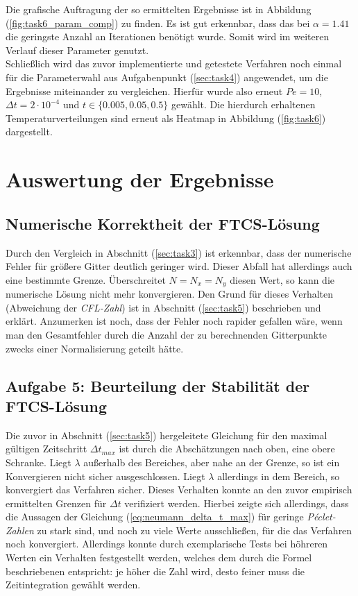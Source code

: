 \documentclass[12pt,a4paper,titlepage,headinclude,bibtotoc]{scrartcl}
\begin{document}
\hfill%
\noindent\begin{minipage}[t]{0.45\textwidth}%
\vspace{1cm}
Die grafische Auftragung der so ermittelten Ergebnisse ist in Abbildung (\ref{fig:task6_param_comp}) zu finden. Es ist gut erkennbar, dass das bei $\alpha=1.41$ die geringste Anzahl an Iterationen benötigt wurde. Somit wird im weiteren Verlauf dieser Parameter genutzt.\\
Schließlich wird das zuvor implementierte und getestete Verfahren noch einmal für die Parameterwahl aus Aufgabenpunkt (\ref{sec:task4}) angewendet, um die Ergebnisse miteinander zu vergleichen. Hierfür wurde also erneut $Pe = 10$, $\Delta t = 2 \cdot 10^{-4}$ und $t \in \{0.005, 0.05, 0.5\}$ gewählt. Die hierdurch erhaltenen Temperaturverteilungen sind erneut als Heatmap in Abbildung (\ref{fig:task6}) dargestellt.
\end{minipage}%
\hfill%

\section{Auswertung der Ergebnisse}
\label{sec:interpretation}
\subsection{Numerische Korrektheit der FTCS-Lösung}
\label{sec:disc_num_corr}
Durch den Vergleich in Abschnitt (\ref{sec:task3}) ist erkennbar, dass der numerische Fehler für größere Gitter deutlich geringer wird. Dieser Abfall hat allerdings auch eine bestimmte Grenze. Überschreitet $N = N_x = N_y$ diesen Wert, so kann die numerische Lösung nicht mehr konvergieren. Den Grund für dieses Verhalten (Abweichung der \textit{CFL-Zahl}) ist in Abschnitt (\ref{sec:task5}) beschrieben und erklärt. Anzumerken ist noch, dass der Fehler noch rapider gefallen wäre, wenn man den Gesamtfehler durch die Anzahl der zu berechnenden Gitterpunkte zwecks einer Normalisierung geteilt hätte.

\subsection{Aufgabe 5: Beurteilung der Stabilität der FTCS-Lösung}
\label{sec:disc_stability}
Die zuvor in Abschnitt (\ref{sec:task5}) hergeleitete Gleichung für den maximal gültigen Zeitschritt $\Delta t_{max}$ ist durch die Abschätzungen nach oben, eine obere Schranke. Liegt $\lambda$ außerhalb des Bereiches, aber nahe an der Grenze, so ist ein Konvergieren nicht sicher ausgeschlossen. Liegt $\lambda$ allerdings in dem Bereich, so konvergiert das Verfahren sicher. Dieses Verhalten konnte an den zuvor empirisch ermittelten Grenzen für $\Delta t$ verifiziert werden. Hierbei zeigte sich allerdings, dass die Aussagen der Gleichung (\ref{eq:neumann_delta_t_max}) für geringe \textit{Péclet-Zahlen} zu stark sind, und noch zu viele Werte ausschließen, für die das Verfahren noch konvergiert. Allerdings konnte durch exemplarische Tests bei höhreren Werten ein Verhalten festgestellt werden, welches dem durch die Formel beschriebenen entspricht: je höher die Zahl wird, desto feiner muss die Zeitintegration gewählt werden.
\end{document}
